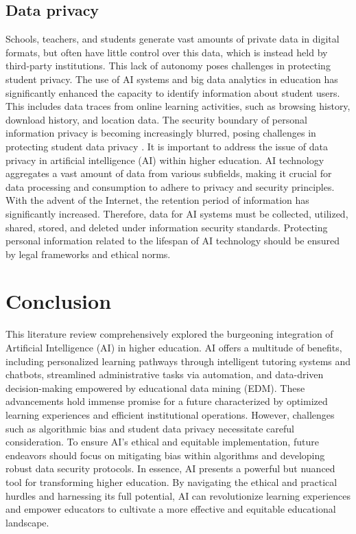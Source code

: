 \subsection{Data privacy}
Schools, teachers, and students generate vast amounts of private data in digital formats,
but often have little control over this data, which is instead held by third-party institutions. This
lack of autonomy poses challenges in protecting student privacy. The use of AI systems and big
data analytics in education has significantly enhanced the capacity to identify information about
student users. This includes data traces from online learning activities, such as browsing history,
download history, and location data. The security boundary of personal information privacy is 
becoming increasingly blurred, posing challenges in protecting student data privacy \citep{huang_ethics_2023}. 
It is important to address the issue  of data privacy in artificial intelligence (AI) within higher 
education. AI technology aggregates a vast amount of data from various subfields, 
making it crucial for data processing and consumption to adhere to privacy and security principles.
With the advent of the Internet, the retention period  of information has significantly increased. 
Therefore, data for AI systems must be collected, utilized,  shared, stored, and deleted under information 
security standards. Protecting personal information related to the lifespan of AI technology
should be ensured by legal frameworks and ethical norms\citep{unesco_2022}.

\section{Conclusion}
This literature review comprehensively explored the burgeoning integration of Artificial Intelligence (AI) in higher education.
AI offers a multitude of benefits, including personalized learning pathways through intelligent tutoring systems and chatbots,
streamlined administrative tasks via automation, and data-driven decision-making empowered by educational data mining (EDM).
These advancements hold immense promise for a future characterized by optimized learning experiences and efficient institutional
operations. However, challenges such as algorithmic bias and student data privacy necessitate careful consideration.
To ensure AI's ethical and equitable implementation, future endeavors should focus on mitigating bias within algorithms and developing
robust data security protocols. In essence, AI presents a powerful but nuanced tool for transforming higher education.
By navigating the ethical and practical hurdles and harnessing its full potential, AI can revolutionize learning experiences
and empower educators to cultivate a more effective and equitable educational landscape.

